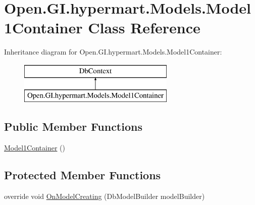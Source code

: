 \hypertarget{class_open_1_1_g_i_1_1hypermart_1_1_models_1_1_model1_container}{}\section{Open.\+G\+I.\+hypermart.\+Models.\+Model1\+Container Class Reference}
\label{class_open_1_1_g_i_1_1hypermart_1_1_models_1_1_model1_container}
Inheritance diagram for Open.\+G\+I.\+hypermart.\+Models.\+Model1\+Container\+:\begin{figure}[H]
\begin{center}
\leavevmode
\includegraphics[height=2.000000cm]{class_open_1_1_g_i_1_1hypermart_1_1_models_1_1_model1_container}
\end{center}
\end{figure}
\subsection*{Public Member Functions}
\begin{DoxyCompactItemize}
\item 
\hyperlink{class_open_1_1_g_i_1_1hypermart_1_1_models_1_1_model1_container_a8d957335d29c47427c9d9062c11e6205}{Model1\+Container} ()
\end{DoxyCompactItemize}
\subsection*{Protected Member Functions}
\begin{DoxyCompactItemize}
\item 
override void \hyperlink{class_open_1_1_g_i_1_1hypermart_1_1_models_1_1_model1_container_a738eaf983c5fc89665bff3d90f9fb188}{On\+Model\+Creating} (Db\+Model\+Builder model\+Builder)
\end{DoxyCompactItemize}
